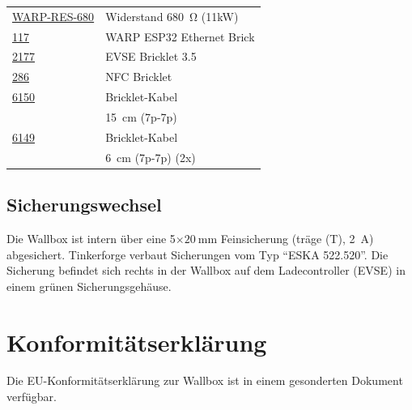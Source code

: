 \documentclass[a4paper,10pt]{article}
\begin{document}
\begin{multicols*}{2}
\begin{tabular}{ll}
        \cmidrule(lr{0.5em}){1-2}
        \href{https://www.tinkerforge.com/de/shop/warp/warp3-spare-parts/warp-res-680.html}{WARP-RES-680}							& Widerstand \SI{680}{\ohm} (11kW)            \\
        \cmidrule(lr{0.5em}){1-2}
        \href{https://www.tinkerforge.com/de/shop/warp/warp3-spare-parts/warp3-esp32-eth.html}{117}									& WARP ESP32 Ethernet Brick                 \\
        \cmidrule(lr{0.5em}){1-2}
        \href{https://www.tinkerforge.com/de/shop/warp/warp3-spare-parts/evse-v3-bricklet.html}{2177}								& EVSE Bricklet 3.5                    \\
        \cmidrule(lr{0.5em}){1-2}
        \href{https://www.tinkerforge.com/de/shop/warp/warp3-spare-parts/nfc-bricklet.html}{286}                                    & NFC Bricklet                         \\
        \cmidrule(lr{0.5em}){1-2}
        \href{https://www.tinkerforge.com/de/shop/accessories/cable/bricklet-cable-15cm-7p-7p.html}{6150}							& Bricklet-Kabel                       \\
                                                                                                                                    & \SI{15}{\centi\meter} (7p-7p)        \\
        \cmidrule(lr{0.5em}){1-2}
        \href{https://www.tinkerforge.com/de/shop/accessories/cable/bricklet-cable-6cm-7p-7p.html}{6149}							& Bricklet-Kabel                       \\
                                                                                                                                    & \SI{6}{\centi\meter} (7p-7p) (2x)\\
        \bottomrule
    \end{tabular}

    \subsection{Sicherungswechsel}
    Die Wallbox ist intern über eine 5$\times\SI{20}{\milli\meter}$
	Feinsicherung (träge (T), \SI{2}{\ampere}) abgesichert.
    Tinkerforge verbaut Sicherungen vom Typ \enquote{ESKA 522.520}.
	Die Sicherung befindet sich rechts in der Wallbox auf dem Ladecontroller
	(EVSE) in einem grünen Sicherungsgehäuse.

    \section{Konformitätserklärung}
    Die EU-Konformitätserklärung zur Wallbox ist in einem gesonderten Dokument verfügbar.


\end{multicols*}
\end{document}
